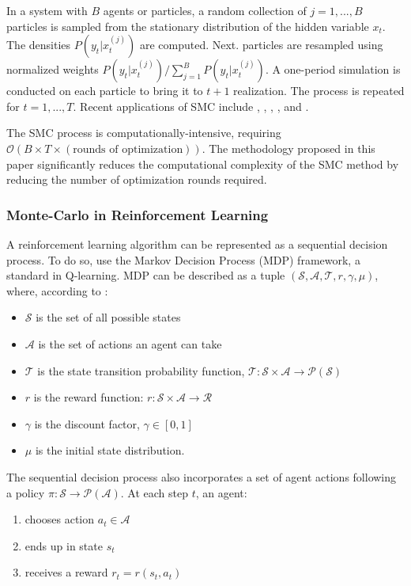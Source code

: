 \documentclass{wscpaperproc}
\theoremstyle{wsc}
\begin{document}
In a system with $B$ agents or particles, a random collection of $j=1,...,B$ particles is sampled from the stationary distribution of the hidden variable $x_t$. The densities $P(y_t|x_t^{(j)})$ are computed. Next. particles are resampled using normalized weights $P(y_t|x_t^{(j)})/\sum_{j=1}^B P(y_t|x_t^{(j)})$. A one-period simulation is conducted on each particle to bring it to $t+1$ realization. The process is repeated for $t=1,...,T$.  Recent applications of SMC include , , , ,  and . 

The SMC process is computationally-intensive, requiring $\mathcal{O}(B\times T\times  (\text{rounds of optimization}))$. The methodology proposed in this paper significantly reduces the computational complexity of the SMC method by reducing the number of optimization rounds required.

\subsubsection{Monte-Carlo in Reinforcement Learning}

A reinforcement learning algorithm can be represented as a sequential decision process. To do so,  use the Markov Decision Process (MDP) framework, a standard in Q-learning.  MDP can be described as a tuple $(\mathcal{S}, \mathcal{A},\mathcal{T}, r, \gamma, \mu)$, where, according to :
\begin{itemize}
    \item $\mathcal{S}$ is the set of all possible states
    \item $\mathcal{A}$ is the set of actions an agent can take
    \item $\mathcal{T}$ is the state transition probability function, $\mathcal{T}: \mathcal{S}\times\mathcal{A}\to\mathcal{P}(\mathcal{S})$
    \item $r$ is the reward function: $r: \mathcal{S}\times\mathcal{A}\to\mathcal{R}$
    \item $\gamma$ is the discount factor, $\gamma\in[0,1]$
    \item $\mu$ is the initial state distribution. 
\end{itemize}

 The sequential decision process also incorporates a set of agent actions following a policy $\pi: \mathcal{S}\to\mathcal{P}(\mathcal{A})$. At each step $t$, an agent:
 \begin{enumerate}
     \item chooses action $a_t\in\mathcal{A}$
     \item ends up in state $s_t$
     \item receives a reward $r_t = r(s_t, a_t)$
 \end{enumerate}
\end{document}
